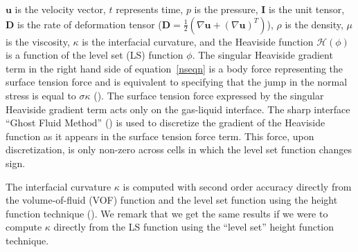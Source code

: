 \documentclass{elsarticle}
\newcommand{\Hea}{\mathcal{H}}
\newcommand{\vv}{\mathbf}
\newcommand{\bmD}{\vv{D}}
\newcommand{\bmg}{\vv{g}}
\newcommand{\bmI}{\vv{I}}
\newcommand{\bmu}{\vv{u}}
\begin{document}
%
%
\par
$\bmu$ is the velocity vector, $t$ represents time, $p$ is the pressure, $\bmI$ is the unit tensor, $\bmD$ is the rate of deformation tensor ($\bmD=\frac{1}{2}(\nabla\bmu+(\nabla\bmu)^{T})$), $\rho$ is the density, $\mu$ is the viscosity, $\kappa$ is the interfacial curvature, and the Heaviside function $\Hea(\phi)$ is a function of the level set (LS) function $\phi$. The singular Heaviside gradient term in the right hand side of equation~\eqref{nseqn} is a body force representing the surface tension force and is equivalent to specifying that the jump in the normal stress is equal to $\sigma\kappa$ (\citet{TanguyEtAl2007}).  The surface tension force expressed by the singular Heaviside gradient term acts only on the gas-liquid interface.  The sharp interface ``Ghost Fluid Method'' (\citet{KanFedLiu00}) is used to discretize the gradient of the Heaviside function as it appears in the surface tension force term.  This force, upon discretization, is only non-zero across cells in which the level set function changes sign.
\par
The interfacial curvature $\kappa$ is computed with second order accuracy directly from the volume-of-fluid (VOF) function and the level set function using the height function technique (\citet{Sus03,SusSmiHusOhtZhi07}).  We remark that we get the same results if we were to compute $\kappa$ directly from the LS function using the ``level set'' height function technique.
\end{document}
